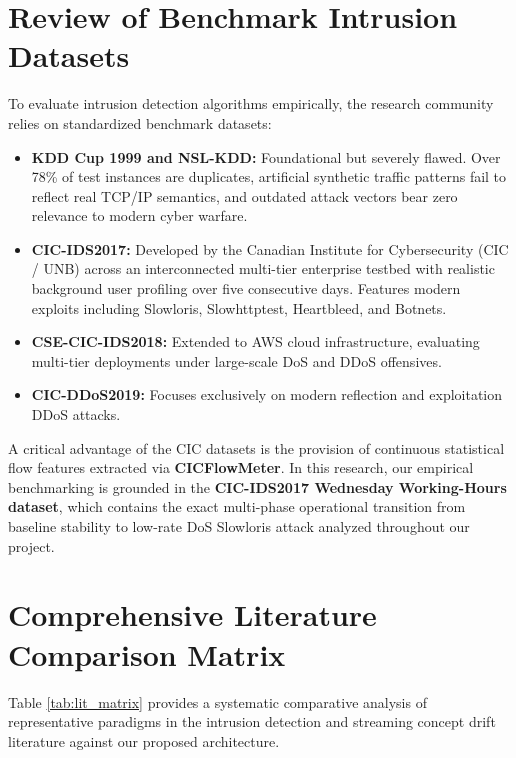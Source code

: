 \documentclass[12pt,a4paper,oneside]{report}
\begin{document}
\section{Review of Benchmark Intrusion Datasets}
To evaluate intrusion detection algorithms empirically, the research community relies on standardized benchmark datasets:
\begin{itemize}
    \item \textbf{KDD Cup 1999 and NSL-KDD:} Foundational but severely flawed. Over 78\% of test instances are duplicates, artificial synthetic traffic patterns fail to reflect real TCP/IP semantics, and outdated attack vectors bear zero relevance to modern cyber warfare.
    \item \textbf{CIC-IDS2017:} Developed by the Canadian Institute for Cybersecurity (CIC / UNB) across an interconnected multi-tier enterprise testbed with realistic background user profiling over five consecutive days. Features modern exploits including Slowloris, Slowhttptest, Heartbleed, and Botnets.
    \item \textbf{CSE-CIC-IDS2018:} Extended to AWS cloud infrastructure, evaluating multi-tier deployments under large-scale DoS and DDoS offensives.
    \item \textbf{CIC-DDoS2019:} Focuses exclusively on modern reflection and exploitation DDoS attacks.
\end{itemize}

A critical advantage of the CIC datasets is the provision of continuous statistical flow features extracted via \textbf{CICFlowMeter}. In this research, our empirical benchmarking is grounded in the \textbf{CIC-IDS2017 Wednesday Working-Hours dataset}, which contains the exact multi-phase operational transition from baseline stability to low-rate DoS Slowloris attack analyzed throughout our project.

\section{Comprehensive Literature Comparison Matrix}
Table \ref{tab:lit_matrix} provides a systematic comparative analysis of representative paradigms in the intrusion detection and streaming concept drift literature against our proposed architecture.
\end{document}
